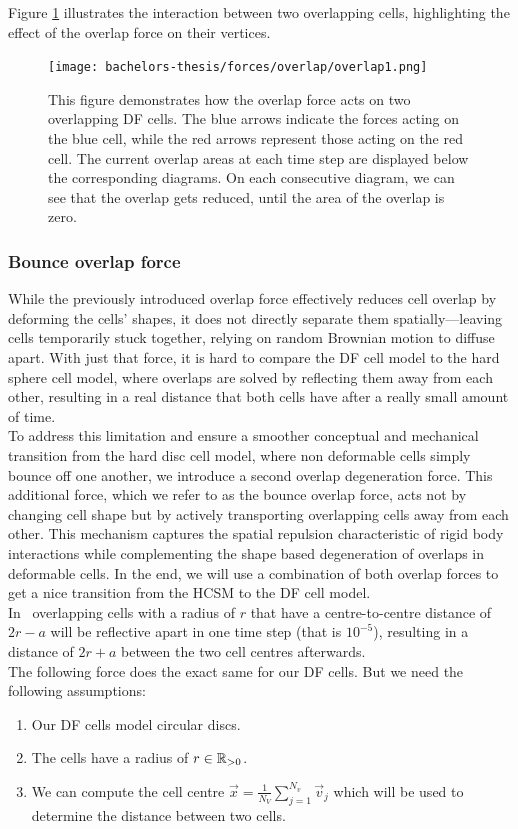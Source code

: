 Figure \ref{fig:overlapForce} illustrates the interaction between two overlapping cells, highlighting the effect of the overlap force on their vertices.
\begin{figure}[h!]
	\begin{center}
		\texttt{[image: bachelors-thesis/forces/overlap/overlap1.png]}
			\caption{This figure demonstrates how the overlap force acts on two overlapping DF cells.
			The blue arrows indicate the forces acting on the blue cell, while the red arrows represent those acting on the red cell.
			The current overlap areas at each time step are displayed below the corresponding diagrams.			
			On each consecutive diagram, we can see that the overlap gets reduced, until the area of the overlap is zero.  }
			\label{fig:overlapForce}
	\end{center}
\end{figure}

\subsubsection*{Bounce overlap force} 
While the previously introduced overlap force effectively reduces cell overlap by deforming the cells' shapes, it does not directly separate them spatially—leaving cells temporarily stuck together, relying on random Brownian motion to diffuse apart. 
With just that force, it is hard to compare the DF cell model to the hard sphere cell model, where overlaps are solved by reflecting them away from each other, resulting in a real distance that both cells have after a really small amount of time. \\  
To address this limitation and ensure a smoother conceptual and mechanical transition from the hard disc cell model, where non deformable cells simply bounce off one another, we introduce a second overlap degeneration force. 
This additional force, which we refer to as the bounce overlap force, acts not by changing cell shape but by actively transporting overlapping cells away from each other. 
This mechanism captures the spatial repulsion characteristic of rigid body interactions while complementing the shape based degeneration of overlaps in deformable cells. 
In the end, we will use a combination of both overlap forces to get a nice transition from the HCSM to the DF cell model. \\ 
In~\cite{Bruna2012} overlapping cells with a radius of $r$ that have a centre-to-centre distance of $2r - a$ will be reflective apart in one time step (that is $10^{-5}$), resulting in a distance of $2r + a$ between the two cell centres afterwards. \\
The following force does the exact same for our DF cells. 
But we need the following assumptions:
\begin{enumerate}
	\item Our DF cells model circular discs. 
	\item The cells have a radius of $r \in \mathbb{R}_{>0}$.
	\item We can compute the cell centre $\vec{x} = \frac{1}{N_V}\sum\limits_{j = 1}^{N_v} \vec{v}_j$ which will be used to determine the distance between two cells. 
\end{enumerate}

